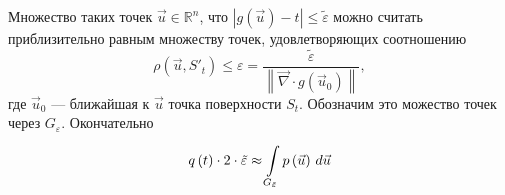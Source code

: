 \begin{comment}
Вернёмся к раздутию. Помним, что $\varepsilon$ --- расстояние от
точки $\vec{u}$ до ближайшей к нему точки кокона, а также то,
что это расстояние должно быть обратно пропорционально
стремительности изменения уровней в этой окрестности.
Понимаем, что нам необходима численная мера этой скорости.
Под описание такой величины прекрасно подходит модуль градиента.
Поскольку значение $g\left( \vec{x} \right)$ не меняется вдоль поверхности $S_t$
и равно $t$, то градиент будет направлен по нормали к данной точке поверхности.

Норма градиента --- отношение прироста функции к приросту координат.
Нас интересует прирост координат $\varepsilon$ в окрестности точки $\vec{u}$,
мы располагаем приростом функции $\tilde{\varepsilon}$
и нормой градиента
$\left\| \vec{\nabla} \cdot {g\left( \vec{u} \right)} \right\|$.
Напрашивается формула
\begin{equation}\label{widthEpsilon}
  \varepsilon \approx \frac{\tilde{\varepsilon}}
      {\left\| \vec{\nabla} \cdot g\left( \vec{u} \right) \right\|}
\end{equation}

Обозначим раздутие поверхности $S_t$ как $G_{\tilde{\varepsilon}}$,
тогда вероятность попадания значения $g\left( \vec{x} \right)$ в коридорчик
ширины $\tilde{\varepsilon}$ будет приблизительно равно интегралу
плотности распределения вектора $\vec{x}$ по этому коридорчику

$$\Probability{g\left( \vec{x} \right)
  \in \left[t-\tilde{\varepsilon}, t+ \tilde{\varepsilon}\right]}
  \approx q\left( t \right) \cdot 2 \cdot \tilde{\varepsilon}
  \approx \integrall{G_{\tilde{\varepsilon}}}{d\vec{u}}{\pdf{\vec{u}}}$$
\end{comment}

Множество таких точек $\vec{u} \in \mathbb{R}^n$, что
$\left| g\left( \vec{u} \right) - t \right| \le \tilde{\varepsilon}$
можно считать приблизительно равным множеству точек, удовлетворяющих
соотношению
\begin{equation}\label{widthEpsilon}
  \rho\left( \vec{u}, S'_t \right) \le \varepsilon
  = \frac{\tilde{\varepsilon}}
    {\left\| \vec{\nabla} \cdot g\left( \vec{u}_0 \right) \right\|},
\end{equation}
где $\vec{u}_0$ --- ближайшая к $\vec{u}$ точка поверхности $S_t$.
Обозначим это можество точек через $G_{\varepsilon}$.
Окончательно
\begin{equation*}
  q\left( t \right) \cdot 2 \cdot \tilde{\varepsilon}
  \approx \integrall{G_{\tilde{\varepsilon}}}{d\vec{u}}{\pdf{\vec{u}}}
\end{equation*}

